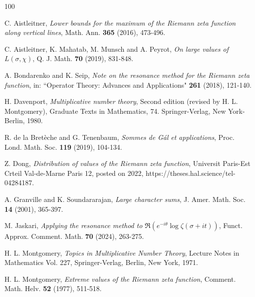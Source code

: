 \documentclass[12pt]{amsart}
\numberwithin{equation}{section}
\theoremstyle{plain}
\theoremstyle{remark}
\theoremstyle{definition}
\theoremstyle{remark}
\begin{document}
\begin{thebibliography}{100}

%


C. Aistleitner, {\it Lower bounds for the maximum of the Riemann zeta function along vertical
lines}, Math. Ann. {\bf 365} (2016), 473-496.

C. Aistleitner, K. Mahatab, M. Munsch and A. Peyrot, {\it On large values of $L(\sigma,\chi)$},
Q. J. Math. {\bf 70} (2019), 831-848.

A. Bondarenko and K. Seip, {\it Note on the resonance method for the Riemann zeta function},
in: ``Operator
Theory: Advances and Applications" {\bf 261} (2018), 121-140.

H. Davenport, {\it Multiplicative number theory}, Second edition (revised by H. L. Montgomery), Graduate Texts in Mathematics, 74. Springer-Verlag, New York-Berlin, 1980.

R. de la Bret\`{e}che and G. Tenenbaum, {\it Sommes de G\'{a}l et applications}, Proc. Lond. Math. Soc. {\bf 119} (2019), 104-134.

Z. Dong, {\it Distribution of values of the Riemann zeta function}, Universit Paris-Est Crteil Val-de-Marne Paris 12, posted on 2022, https://theses.hal.science/tel-04284187.


A. Granville and K. Soundararajan, {\it Large character sums}, J. Amer. Math. Soc. {\bf14} (2001), 365-397.


M. Jaskari, {\it Applying the resonance method to $\Re(e^{-i\theta}\log\zeta(\sigma+it))$}, Funct. Approx. Comment. Math. {\bf70} (2024), 263-275.



H. L. Montgomery, {\it Topics in Multiplicative Number Theory}, Lecture Notes in Mathematics
Vol. 227, Springer-Verlag, Berlin, New York, 1971.


H. L. Montgomery, {\it Extreme values of the Riemann zeta function}, Comment. Math. Helv. {\bf 52} (1977), 511-518.


\end{thebibliography}
\end{document}
